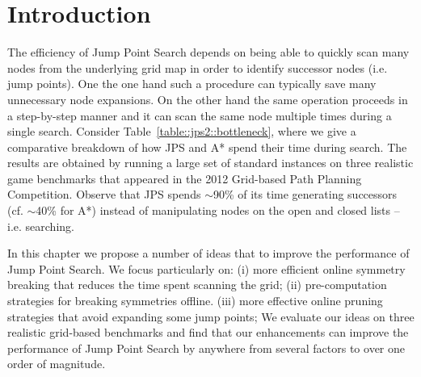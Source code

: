 \section{Introduction}
\label{cha::jps2::introduction}
The efficiency of Jump Point Search depends on being able to quickly scan many nodes
from the underlying grid map in order to identify successor nodes (i.e. jump points).
One the one hand such a procedure can typically save many unnecessary
node expansions. On the other hand the same operation proceeds in a 
step-by-step manner and it can scan the same node multiple times during 
a single search. 
Consider Table~\ref{table::jps2::bottleneck}, where we give a comparative
breakdown of how JPS and A{*} spend their time during search.
The results are obtained by running
a large set of standard instances on three realistic game benchmarks
that appeared in the 2012 Grid-based Path Planning Competition. Observe that
JPS spends $\sim$90\% of its time generating successors (cf. $\sim$40\% for
A{*}) instead of manipulating nodes on the open and closed lists -- i.e.
searching.

In this chapter we propose a number of ideas that to improve the
performance of Jump Point Search. We focus particularly on: (i) 
more efficient online symmetry breaking that reduces the time spent scanning the grid; 
(ii) pre-computation strategies for breaking symmetries offline.
(iii) more effective online pruning strategies that avoid expanding some jump
points; 
We evaluate our ideas on three realistic grid-based benchmarks and
find that our enhancements can improve the performance of Jump Point Search
by anywhere from several factors to over one order of magnitude. 



